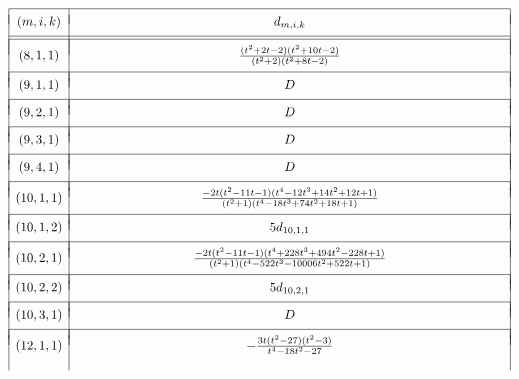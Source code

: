 \begin{table}[!ht]
\[
\begin{array}{|c|c|} 
\hline
 &  \\ [-.75 em]
(m,i ,k ) & 
\hphantom{0000000000000000000000000000000} d_{m,i, k} \hphantom{0000000000000000000000000000000}\\
 &  \\ [-.75 em]
\hline
\hline
& \\ [-.75em]
(8,1,1) &  \frac{(t^2 + 2t - 2)(t^2 + 10t - 2)}{(t^2 + 2)(t^2 + 8t - 2)} \\
& \\ [-.75em]
\hline
& \\ [-.75em]
(9,1,1) & D \\
& \\ [-.75em]
\hline 
& \\ [-.75em]
(9,2,1) & D \\
& \\ [-.75em]
\hline 
& \\ [-.75em]
(9,3,1) & D\\
& \\ [-.75em]
\hline 
& \\ [-.75em]
(9,4,1) & D \\
& \\ [-.75em]
\hline 
& \\ [-.75em]
(10,1,1) & \frac{-2t(t^2 - 11t - 1)(t^4 - 12t^3 + 14t^2 + 12t + 1)}{(t^2+1)(t^4 - 18t^3 + 74t^2 + 18t + 1)}\\
& \\ [-.75em]
\hline 
& \\ [-.75em]
(10,1,2) & 5 d_{10,1,1} \\
& \\ [-.75em]
\hline
& \\ [-.75em]
(10,2,1) &  \frac{-2t(t^2-11t-1)(t^4 + 228t^3 + 494t^2 - 228t + 1)}{(t^2 + 1) (t^4 - 522t^3 - 10006t^2 + 522t + 1)} \\
& \\ [-.75em]
\hline
& \\ [-.75em]
(10,2,2) & 5 d_{10,2,1} \\
& \\ [-.75em]
\hline
& \\ [-.75em]
(10,3,1) & D \\
& \\ [-.75em]
\hline
& \\ [-.75em]
(12,1,1) &  -\frac{3t(t^2-27)(t^2-3)}{t^4-18t^2-27} \\
& \\ [-.75em]

\end{array}\]
\end{table}
